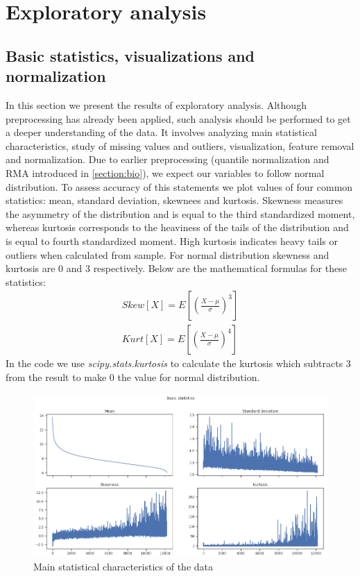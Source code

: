 \documentclass[shortabstract, english, mgr]{iithesis}
\begin{document}
\chapter{Exploratory analysis} \label{section:exploratory}

\section{Basic statistics, visualizations and normalization}

In this section we present the results of exploratory analysis. Although preprocessing has already been applied, such analysis should be performed to get a deeper understanding of the data. It involves analyzing main statistical characteristics, study of missing values and outliers, visualization, feature removal and normalization. Due to earlier preprocessing (quantile normalization and RMA introduced in \ref{section:bio}), we expect our variables to follow normal distribution. To assess accuracy of this statements we plot values of four common statistics: mean, standard deviation, skewnees and kurtosis. Skewness measures the asymmetry of the distribution and is equal to the third standardized moment, whereas kurtosis corresponds to the heaviness of the tails of the distribution and is equal to fourth standardized moment. High kurtosis indicates heavy tails or outliers when calculated from sample. For normal distribution skewness and kurtosis are $0$ and $3$ respectively. Below are the mathematical formulas for these statistics:
\begin{align}
    Skew[X] = E\left[\left(\frac{X-\mu}{\sigma}\right)^3 \right] \nonumber \\
    Kurt[X] = E\left[\left(\frac{X-\mu}{\sigma}\right)^4 \right] \nonumber
\end{align}
In the code we use \textit{scipy.stats.kurtosis} to calculate the kurtosis which subtracts $3$ from the result to make $0$ the value for normal distribution. 

\begin{figure}
\centering
\includegraphics[width=\textwidth]{images/basic_stats.png}
\caption{Main statistical characteristics of the data}
\label{fig:stats}
\end{figure}
\end{document}
